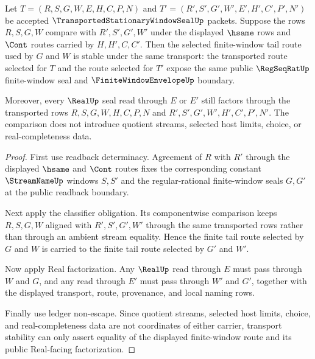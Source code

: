 \begin{theorem}
\label{thm:transported-stationary-window-seal-selected-tail-stability}
Let $T=(R,S,G,W,E,H,C,P,N)$ and $T'=(R',S',G',W',E',H',C',P',N')$ be accepted $\TransportedStationaryWindowSealUp$ packets. Suppose the rows $R,S,G,W$ compare with $R',S',G',W'$ under the displayed $\hsame$ rows and $\Cont$ routes carried by $H,H',C,C'$. Then the selected finite-window tail route used by $G$ and $W$ is stable under the same transport: the transported route selected for $T$ and the route selected for $T'$ expose the same public $\RegSeqRatUp$ finite-window seal and $\FiniteWindowEnvelopeUp$ boundary.

Moreover, every $\RealUp$ seal read through $E$ or $E'$ still factors through the transported rows $R,S,G,W,H,C,P,N$ and $R',S',G',W',H',C',P',N'$. The comparison does not introduce quotient streams, selected host limits, choice, or real-completeness data.
\end{theorem}
\begin{proof}
First use readback determinacy. Agreement of $R$ with $R'$ through the displayed $\hsame$ and $\Cont$ routes fixes the corresponding constant $\StreamNameUp$ windows $S,S'$ and the regular-rational finite-window seals $G,G'$ at the public readback boundary.

Next apply the classifier obligation. Its componentwise comparison keeps $R,S,G,W$ aligned with $R',S',G',W'$ through the same transported rows rather than through an ambient stream equality. Hence the finite tail route selected by $G$ and $W$ is carried to the finite tail route selected by $G'$ and $W'$.

Now apply Real factorization. Any $\RealUp$ read through $E$ must pass through $W$ and $G$, and any read through $E'$ must pass through $W'$ and $G'$, together with the displayed transport, route, provenance, and local naming rows.

Finally use ledger non-escape. Since quotient streams, selected host limits, choice, and real-completeness data are not coordinates of either carrier, transport stability can only assert equality of the displayed finite-window route and its public Real-facing factorization.
\end{proof}

